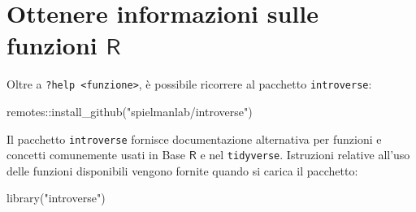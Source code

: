 \documentclass[
  10pt,
  italian,
  a4paper,
  extrafontsizes,onecolumn,openright
  ]{memoir}
\newenvironment{Shaded}{\begin{snugshade}}{\end{snugshade}}
\newcommand{\FunctionTok}[1]{\textcolor[rgb]{0.00,0.00,0.00}{#1}}
\newcommand{\NormalTok}[1]{#1}
\newcommand{\SpecialCharTok}[1]{\textcolor[rgb]{0.00,0.00,0.00}{#1}}
\newcommand{\StringTok}[1]{\textcolor[rgb]{0.31,0.60,0.02}{#1}}
\newcommand{\R}{\textsf{R}} %
\begin{document}
\hypertarget{ottenere-informazioni-sulle-funzioni-r}{%
\section{\texorpdfstring{Ottenere informazioni sulle funzioni \(\R\)}{Ottenere informazioni sulle funzioni \textbackslash R}}\label{ottenere-informazioni-sulle-funzioni-r}}

Oltre a \texttt{?help\ \textless{}funzione\textgreater{}}, è possibile ricorrere al pacchetto \texttt{introverse}:

\begin{Shaded}
\begin{Highlighting}[]
\NormalTok{remotes}\SpecialCharTok{::}\FunctionTok{install\_github}\NormalTok{(}\StringTok{"spielmanlab/introverse"}\NormalTok{)}
\end{Highlighting}
\end{Shaded}

\noindent
Il pacchetto \texttt{introverse} fornisce documentazione alternativa per funzioni e concetti comunemente usati in Base \(\R\) e nel \texttt{tidyverse}. Istruzioni relative all'uso delle funzioni disponibili vengono fornite quando si carica il pacchetto:

\begin{Shaded}
\begin{Highlighting}[]
\FunctionTok{library}\NormalTok{(}\StringTok{"introverse"}\NormalTok{)}
\end{Highlighting}
\end{Shaded}
\end{document}
